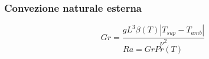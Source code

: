 \documentclass[a4paper,10pt]{article}                                                                                       %
\begin{document}
\subsubsection{Convezione naturale esterna}                                                                                 %
\label{subsubsec:ext_air_conv}                                                                                              %
\vspace{1mm}                                                                                                                %
\begin{equation}                                                                                                            %
  \label{eqn:gr}                                                                                                            %
  Gr = \frac{gL^3\beta(T)|T_{sup}-T_{amb}|}{\nu^2}                                                                          %
\end{equation}                                                                                                              %
\vspace{3mm}                                                                                                                %
\begin{equation}                                                                                                            %
  \label{eqn:ra}                                                                                                            %
  Ra = GrPr(T)                                                                                                              %
\end{equation}                                                                                                              %
\vspace{3mm}                                                                                                                %
\end{document}
